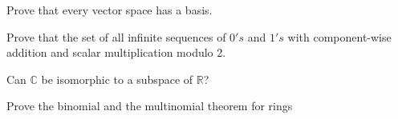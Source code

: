 \documentclass[final,expand]{problemset}
\begin{document}
\problem
Prove that every vector space has a basis.

\problem
Prove that the set of all infinite sequences of $0's$ and $1's$ with component-wise addition and scalar multiplication modulo 2.

\problem
Can $\mathbb{C}$ be isomorphic to a subspace of $\mathbb{R}$?

\problem
Prove the binomial and the multinomial theorem for rings
\end{document}
